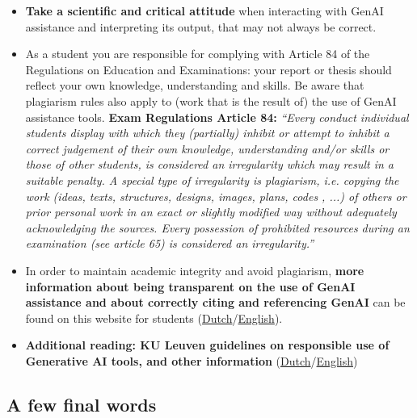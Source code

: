 \begin{itemize}
    \item \textbf{Take a scientific and critical attitude} when interacting with GenAI assistance and interpreting its output, that may not always be correct. 
    
    \item As a student you are responsible for complying with Article 84 of the Regulations on Education and Examinations: your report or thesis should reflect your own knowledge, understanding and skills. Be aware that plagiarism rules also apply to (work that is the result of) the use of GenAI assistance tools. 
    \newline
    \textbf{Exam Regulations Article 84:} \textit{“Every conduct individual students display with which they (partially) inhibit or attempt to inhibit a correct judgement of their own knowledge, understanding and/or skills or those of other students, is considered an irregularity which may result in a suitable penalty. A special type of irregularity is plagiarism, i.e. copying the work (ideas, texts, structures, designs, images, plans, codes , ...) of others or prior personal work in an exact or slightly modified way without adequately acknowledging the sources. Every possession of prohibited resources during an examination (see article 65) is considered an irregularity.”}
    
    \item In order to maintain academic integrity and avoid plagiarism, \textbf{more information about being transparent on the use of GenAI assistance and about correctly citing and referencing GenAI} can be found on this website for students (\href{https://www.kuleuven.be/onderwijs/student/onderwijstools/artificiele-intelligentie#Transparantie}{Dutch}/\href{https://www.kuleuven.be/english/education/student/educational-tools/generative-artificial-intelligence#Transparency}{English}). 
    
    \item \textbf{Additional reading: KU Leuven guidelines on responsible use of Generative AI tools, and other information }(\href{https://www.kuleuven.be/genai}{Dutch}/\href{https://www.kuleuven.be/english/genai}{English})
\end{itemize}

\subsection*{A few final words}

